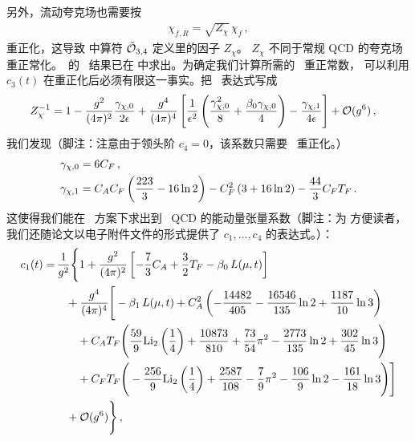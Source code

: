 另外，流动夸克场也需要按
\begin{equation}
  \begin{split}
    \chi_{f,R} = \sqrt{Z_\chi}\,\chi_{f}\,,
  \end{split}
\end{equation}
重正化，这导致  中算符 $\tilde{\mathcal{O}}_{3,4}$ 定义里的因子 $Z_\chi$。
$Z_\chi$ 不同于常规 QCD 的夸克场重正常化。\nlo\ 的 \msbar\ 结果已在
 中求出。为确定我们计算所需的 \nnlo\ 重正常数，
可以利用 $c_3(t)$ 在重正化后必须有限这一事实。把 \msbar\ 表达式写成
\begin{equation}
  \begin{split}
    Z^{-1}_\chi &=
    1
      -\gcoup{2}\frac{\gamma_{\chi,0}}{2\ep}
      +\gcoup{4}\left[\frac{1}{\ep^2}\left(
        \frac{\gamma_{\chi,0}^2}{8} +
        \frac{\beta_0\gamma_{\chi,0}}{4}\right)
        -\frac{\gamma_{\chi,1}}{4\ep}\right] + \order{g^6}\,,
    \label{eq:zchi}
  \end{split}
\end{equation}
我们发现（脚注：注意由于领头阶 $c_4=0$，该系数只需要 \nlo\ 重正化。）
\begin{equation}
  \begin{split}
  \gamma_{\chi,0} &= 6C_F\,,\\
  \gamma_{\chi, 1} &=
  C_A C_F \left( \frac{223}{3} - 16 \ln 2 \right) - C_F^2 \left( 3 + 16
  \ln 2 \right) - \frac{44}{3} C_F T_F\,.
  \end{split}
\end{equation}
这使得我们能在 \msbar\ 方案下求出到 \nnlo\ QCD 的能动量张量系数（脚注：为
方便读者，我们还随论文以电子附件文件的形式提供了
$c_1,\ldots,c_4$ 的表达式。）：
\begin{equation}
  \begin{split}
    c_1(t) =& \, \frac{1}{g^2} \Bigg\{ 1 + \gcoup{2}
    \left[ - \frac{7}{3}  C_A + \frac{3}{2}
      \TF -  \beta _0 \, L (\mu, t) \right] \\
	& \quad + \gcoup{4} \Bigg[ - \beta_1 \, L
      (\mu, t) + C_A^2 \left( - \frac{14482}{405} - \frac{16546}{135}
      \ln 2 + \frac{1187}{10} \ln 3 \right) \\
      & \qquad + C_A \TF \Bigg( \frac{59}{9}
      \text{Li}_2\left(\frac{1}{4}\right) + \frac{10873}{810} +
      \frac{73}{54} \pi^2 - \frac{2773}{135} \ln 2 + \frac{302}{45} \ln
      3 \Bigg) \\
	& \qquad + C_F \TF \Bigg( - \frac{256}{9}
      \text{Li}_2\left(\frac{1}{4}\right) +\frac{2587}{108} -
      \frac{7}{9} \pi^2 - \frac{106}{9} \ln 2 - \frac{161}{18} \ln 3
      \Bigg) \Bigg] \\
    & \quad + \order{g^6} \Bigg\} \, ,
    \label{eq:c1}
  \end{split}
\end{equation}
